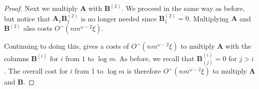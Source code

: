 \begin{proof}
Next we multiply $\mathbf{A}$ with $\mathbf{B}^{(2)}$. We proceed
in the same way as before, but notice that $\mathbf{A}_{1}\mathbf{B}_{1}^{(2)}$
is no longer needed since $\mathbf{B}_{1}^{(2)}=0$. Multiplying $\mathbf{A}$
and $\mathbf{B}^{(2)}$ also costs $O^{\sim}\left(nm^{\omega-2}\xi\right)$.

Continuing to doing this, gives a costs of $O^{\sim}\left(nm^{\omega-2}\xi\right)$
to multiply $\mathbf{A}$ with the columns $\mathbf{B}^{(i)}$ for
$i$ from $1$ to $\log m$. As before, we recall that $\mathbf{B}_{(j)}^{(i)}=0$
for $j>i$. The overall cost for $i$ from 1 to $\log m$ is therefore
$O^{\sim}\left(nm^{\omega-2}\xi\right)$ to multiply $\mathbf{A}$
and $\mathbf{B}$. \end{proof}

